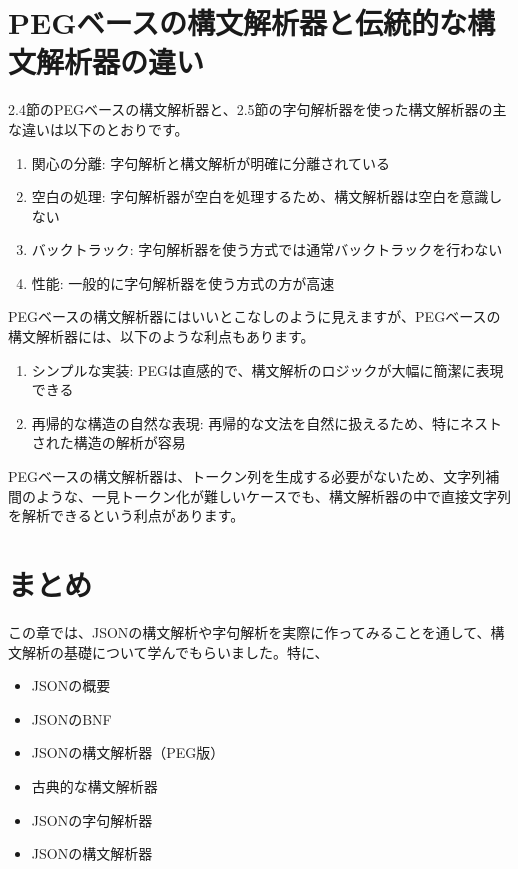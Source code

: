 \section{PEGベースの構文解析器と伝統的な構文解析器の違い}

2.4節のPEGベースの構文解析器と、2.5節の字句解析器を使った構文解析器の主な違いは以下のとおりです。

\begin{enumerate}
\item
  関心の分離: 字句解析と構文解析が明確に分離されている
\item
  空白の処理:
  字句解析器が空白を処理するため、構文解析器は空白を意識しない
\item
  バックトラック: 字句解析器を使う方式では通常バックトラックを行わない
\item
  性能: 一般的に字句解析器を使う方式の方が高速
\end{enumerate}

PEGベースの構文解析器にはいいとこなしのように見えますが、PEGベースの構文解析器には、以下のような利点もあります。

\begin{enumerate}
\item
  シンプルな実装:
  PEGは直感的で、構文解析のロジックが大幅に簡潔に表現できる
\item
  再帰的な構造の自然な表現:
  再帰的な文法を自然に扱えるため、特にネストされた構造の解析が容易
\end{enumerate}

PEGベースの構文解析器は、トークン列を生成する必要がないため、文字列補間のような、一見トークン化が難しいケースでも、構文解析器の中で直接文字列を解析できるという利点があります。

\section{まとめ}

この章では、JSONの構文解析や字句解析を実際に作ってみることを通して、構文解析の基礎について学んでもらいました。特に、

\begin{itemize}
\item
  JSONの概要
\item
  JSONのBNF
\item
  JSONの構文解析器（PEG版）
\item
  古典的な構文解析器
\item
  JSONの字句解析器
\item
  JSONの構文解析器
\end{itemize}

